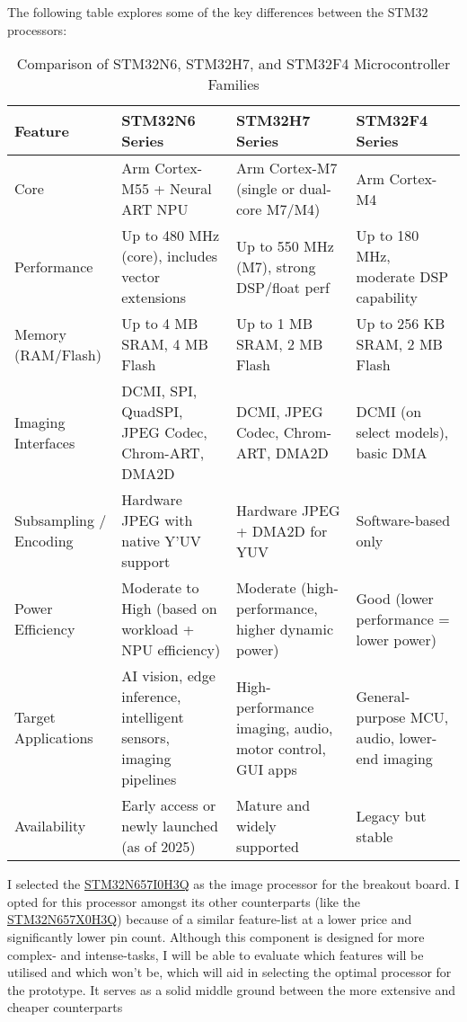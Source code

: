 \documentclass[10pt]{article}
\begin{document}
The following table explores some of the key differences between the STM32 processors:
\begin{table}[H]
\centering
\begin{tabular}{|p{2cm}|p{3.75cm}|p{3.75cm}|p{3.75cm}|}
\hline
\textbf{Feature} & \textbf{STM32N6 Series} & \textbf{STM32H7 Series} & \textbf{STM32F4 Series} \\
\hline
Core & Arm Cortex-M55 + Neural ART NPU & Arm Cortex-M7 (single or dual-core M7/M4) & Arm Cortex-M4 \\
\hline
Performance & Up to 480 MHz (core), includes vector extensions & Up to 550 MHz (M7), strong DSP/float perf & Up to 180 MHz, moderate DSP capability \\
\hline
Memory (RAM/Flash) & Up to 4 MB SRAM, 4 MB Flash & Up to 1 MB SRAM, 2 MB Flash & Up to 256 KB SRAM, 2 MB Flash \\
\hline
Imaging Interfaces & DCMI, SPI, QuadSPI, JPEG Codec, Chrom-ART, DMA2D & DCMI, JPEG Codec, Chrom-ART, DMA2D & DCMI (on select models), basic DMA \\
\hline
Subsampling / Encoding & Hardware JPEG with native Y'UV support & Hardware JPEG + DMA2D for YUV & Software-based only \\
\hline
Power Efficiency & Moderate to High (based on workload + NPU efficiency) & Moderate (high-performance, higher dynamic power) & Good (lower performance = lower power) \\
\hline
Target Applications & AI vision, edge inference, intelligent sensors, imaging pipelines & High-performance imaging, audio, motor control, GUI apps & General-purpose MCU, audio, lower-end imaging \\
\hline
Availability & Early access or newly launched (as of 2025) & Mature and widely supported & Legacy but stable \\
\hline
\end{tabular}
\caption{Comparison of STM32N6, STM32H7, and STM32F4 Microcontroller Families}
\label{tab:stm32-family-comparison}
\end{table}
I selected the \href{https://au.mouser.com/ProductDetail/STMicroelectronics/STM32N657I0H3Q?qs=a2MtRaTmNOQAexZMsq8u8A%3D%3D}{STM32N657I0H3Q} as the image processor for the breakout board. I opted for this processor amongst its other counterparts (like the \href{https://au.mouser.com/ProductDetail/STMicroelectronics/STM32N657X0H3Q?qs=%252BXxaIXUDbq0JgAtfYs%252BpjA%3D%3D}{STM32N657X0H3Q}) because of a similar feature-list at a lower price and significantly lower pin count.
Although this component is designed for more complex- and intense-tasks, I will be able to evaluate which features will be utilised and which won't be, which will aid in selecting the optimal processor for the prototype. It serves as a solid middle ground between the more extensive and cheaper counterparts
\end{document}
